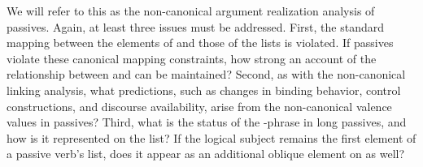 \documentclass[output=paper
 	        ,biblatex
                ,babelshorthands
                ,newtxmath
                ,draftmode
                ,colorlinks, citecolor=brown
]{langscibook}
\begin{document}

We will refer to this as the non-canonical argument realization analysis of passives. Again, at least three 
issues must be addressed.
First, the standard mapping between the elements of \argst and those of the  lists is violated.
If passives violate these canonical mapping constraints, how strong an account of the relationship between \argst and  can be maintained?
Second, as with the non-canonical linking analysis, what predictions, such as changes in binding behavior, control constructions, and discourse availability, arise from the non-canonical valence values in passives?
Third, what is the status of the -phrase in long passives, and how is it represented on the \argst list?  If the logical subject remains the first element of a passive verb's \argst list, does it appear as an additional oblique element on \argst as well? 
\end{document}
